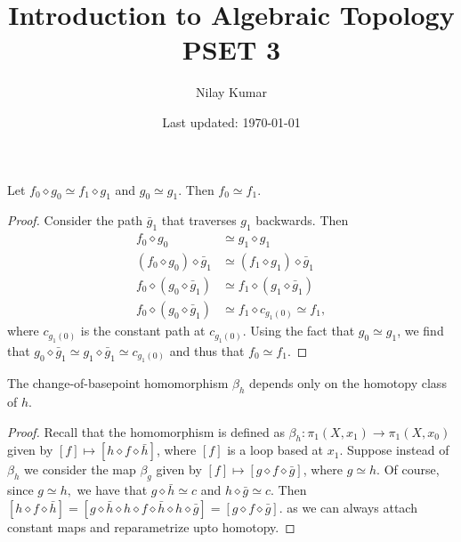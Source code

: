 \documentclass{../../mathnotes}
\title{Introduction to Algebraic Topology PSET 3}
\author{Nilay Kumar}
\date{Last updated: \today}
\begin{document}
\maketitle

\begin{prop}
    Let $f_0\diamond g_0\simeq f_1\diamond g_1$ and $g_0\simeq g_1$. Then $f_0\simeq f_1$.
\end{prop}
\begin{proof}
    Consider the path $\bar g_1$ that traverses $g_1$ backwards. Then
    \begin{align*}
        f_0\diamond g_0&\simeq g_1\diamond g_1\\
        (f_0\diamond g_0)\diamond \bar g_1&\simeq (f_1\diamond g_1)\diamond \bar g_1\\
        f_0\diamond (g_0\diamond \bar g_1)&\simeq f_1\diamond(g_1\diamond\bar g_1)\\
        f_0\diamond (g_0\diamond \bar g_1)&\simeq f_1\diamond c_{g_1(0)}\simeq f_1,
    \end{align*}
    where $c_{g_1(0)}$ is the constant path at $c_{g_1(0)}$. Using the fact that $g_0\simeq g_1$,
    we find that $g_0\diamond \bar g_1\simeq g_1\diamond\bar g_1\simeq c_{g_1(0)}$ and thus that
    $f_0\simeq f_1$.
\end{proof}

\begin{prop}
    The change-of-basepoint homomorphism $\beta_h$ depends only on the homotopy class of $h$.
\end{prop}
\begin{proof}
    Recall that the homomorphism is defined as $\beta_h:\pi_1(X,x_1)\to\pi_1(X,x_0)$ given
    by $[f]\mapsto[h\diamond f\diamond \bar h]$, where $[f]$ is a loop based at $x_1$.
    Suppose instead of $\beta_h$ we consider the map $\beta_g$ given by $[f]\mapsto[g\diamond f
    \diamond \bar g]$, where $g\simeq h$. Of course, since $g\simeq h,$ we have that $g\diamond \bar h\simeq c$
    and $h\diamond \bar g\simeq c$. Then $[h\diamond f\diamond \bar h]=[g\diamond\bar h\diamond h\diamond f\diamond \bar h\diamond h\diamond\bar g]=[g\diamond f\diamond\bar g]$.
    as we can always attach constant maps and reparametrize upto homotopy.
\end{proof}
\end{document}
